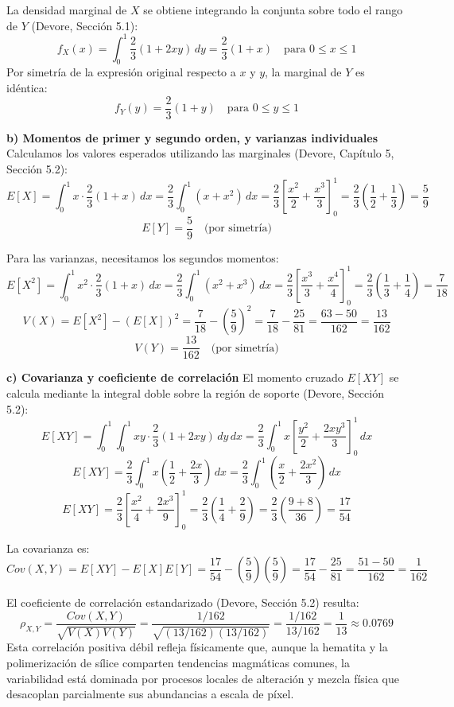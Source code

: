 La densidad marginal de $X$ se obtiene integrando la conjunta sobre todo el rango de $Y$ (Devore, Sección 5.1):
$$ f_X(x) = \int_{0}^{1} \frac{2}{3}(1 + 2xy) \, dy = \frac{2}{3}(1 + x) \quad \text{para } 0 \le x \le 1 $$
Por simetría de la expresión original respecto a $x$ y $y$, la marginal de $Y$ es idéntica:
$$ f_Y(y) = \frac{2}{3}(1 + y) \quad \text{para } 0 \le y \le 1 $$

\textbf{b) Momentos de primer y segundo orden, y varianzas individuales}
Calculamos los valores esperados utilizando las marginales (Devore, Capítulo 5, Sección 5.2):
$$ E[X] = \int_{0}^{1} x \cdot \frac{2}{3}(1 + x) \, dx = \frac{2}{3} \int_{0}^{1} (x + x^2) \, dx = \frac{2}{3} \left[ \frac{x^2}{2} + \frac{x^3}{3} \right]_{0}^{1} = \frac{2}{3} \left( \frac{1}{2} + \frac{1}{3} \right) = \frac{5}{9} $$
$$ E[Y] = \frac{5}{9} \quad \text{(por simetría)} $$

Para las varianzas, necesitamos los segundos momentos:
$$ E[X^2] = \int_{0}^{1} x^2 \cdot \frac{2}{3}(1 + x) \, dx = \frac{2}{3} \int_{0}^{1} (x^2 + x^3) \, dx = \frac{2}{3} \left[ \frac{x^3}{3} + \frac{x^4}{4} \right]_{0}^{1} = \frac{2}{3} \left( \frac{1}{3} + \frac{1}{4} \right) = \frac{7}{18} $$
$$ V(X) = E[X^2] - (E[X])^2 = \frac{7}{18} - \left(\frac{5}{9}\right)^2 = \frac{7}{18} - \frac{25}{81} = \frac{63 - 50}{162} = \frac{13}{162} $$
$$ V(Y) = \frac{13}{162} \quad \text{(por simetría)} $$

\textbf{c) Covarianza y coeficiente de correlación}
El momento cruzado $E[XY]$ se calcula mediante la integral doble sobre la región de soporte (Devore, Sección 5.2):
$$ E[XY] = \int_{0}^{1} \int_{0}^{1} xy \cdot \frac{2}{3}(1 + 2xy) \, dy \, dx = \frac{2}{3} \int_{0}^{1} x \left[ \frac{y^2}{2} + \frac{2xy^3}{3} \right]_{0}^{1} \, dx $$
$$ E[XY] = \frac{2}{3} \int_{0}^{1} x \left( \frac{1}{2} + \frac{2x}{3} \right) \, dx = \frac{2}{3} \int_{0}^{1} \left( \frac{x}{2} + \frac{2x^2}{3} \right) \, dx $$
$$ E[XY] = \frac{2}{3} \left[ \frac{x^2}{4} + \frac{2x^3}{9} \right]_{0}^{1} = \frac{2}{3} \left( \frac{1}{4} + \frac{2}{9} \right) = \frac{2}{3} \left( \frac{9 + 8}{36} \right) = \frac{17}{54} $$

La covarianza es:
$$ Cov(X,Y) = E[XY] - E[X]E[Y] = \frac{17}{54} - \left(\frac{5}{9}\right)\left(\frac{5}{9}\right) = \frac{17}{54} - \frac{25}{81} = \frac{51 - 50}{162} = \frac{1}{162} $$

El coeficiente de correlación estandarizado (Devore, Sección 5.2) resulta:
$$ \rho_{X,Y} = \frac{Cov(X,Y)}{\sqrt{V(X)V(Y)}} = \frac{1/162}{\sqrt{(13/162)(13/162)}} = \frac{1/162}{13/162} = \frac{1}{13} \approx 0.0769 $$
Esta correlación positiva débil refleja físicamente que, aunque la hematita y la polimerización de sílice comparten tendencias magmáticas comunes, la variabilidad está dominada por procesos locales de alteración y mezcla física que desacoplan parcialmente sus abundancias a escala de píxel.


